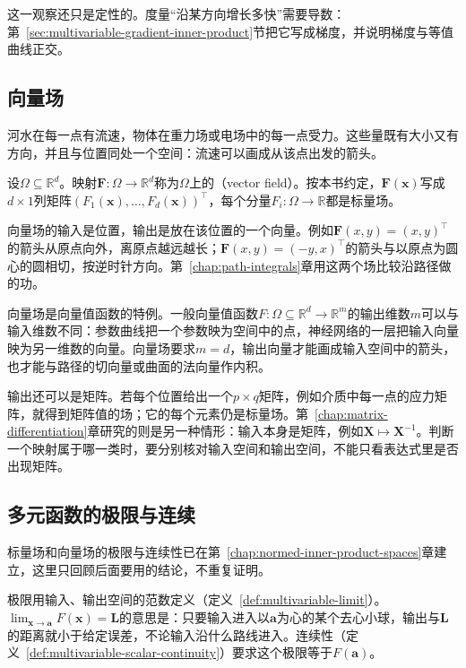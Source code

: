 这一观察还只是定性的。度量“沿某方向增长多快”需要导数：第~\ref{sec:multivariable-gradient-inner-product}节把它写成梯度，并说明梯度与等值曲线正交。

\subsection{向量场}
\label{sec:multivariable-vector-fields}

河水在每一点有流速，物体在重力场或电场中的每一点受力。这些量既有大小又有方向，并且与位置同处一个空间：流速可以画成从该点出发的箭头。
\begin{definition}[向量场]
\label{def:multivariable-vector-field}
设$\Omega\subseteq\mathbb R^d$。映射$\bm F:\Omega\to\mathbb R^d$称为$\Omega$上的（vector field）。按本书约定，$\bm F(\bm x)$写成$d\times1$列矩阵$(F_1(\bm x),\ldots,F_d(\bm x))^\top$，每个分量$F_i:\Omega\to\mathbb R$都是标量场。
\end{definition}
向量场的输入是位置，输出是放在该位置的一个向量。例如$\bm F(x,y)=(x,y)^\top$的箭头从原点向外，离原点越远越长；$\bm F(x,y)=(-y,x)^\top$的箭头与以原点为圆心的圆相切，按逆时针方向。第~\ref{chap:path-integrals}章用这两个场比较沿路径做的功。

向量场是向量值函数的特例。一般向量值函数$F:\Omega\subseteq\mathbb R^d\to\mathbb R^m$的输出维数$m$可以与输入维数不同：参数曲线把一个参数映为空间中的点，神经网络的一层把输入向量映为另一维数的向量。向量场要求$m=d$，输出向量才能画成输入空间中的箭头，也才能与路径的切向量或曲面的法向量作内积。

输出还可以是矩阵。若每个位置给出一个$p\times q$矩阵，例如介质中每一点的应力矩阵，就得到矩阵值的场；它的每个元素仍是标量场。第~\ref{chap:matrix-differentiation}章研究的则是另一种情形：输入本身是矩阵，例如$\bm X\mapsto\bm X^{-1}$。判断一个映射属于哪一类时，要分别核对输入空间和输出空间，不能只看表达式里是否出现矩阵。

\subsection{多元函数的极限与连续}
\label{sec:multivariable-field-limits-continuity}

标量场和向量场的极限与连续性已在第~\ref{chap:normed-inner-product-spaces}章建立，这里只回顾后面要用的结论，不重复证明。

极限用输入、输出空间的范数定义（定义~\ref{def:multivariable-limit}）。$\lim_{\bm x\to\bm a}F(\bm x)=\bm L$的意思是：只要输入进入以$\bm a$为心的某个去心小球，输出与$\bm L$的距离就小于给定误差，不论输入沿什么路线进入。连续性（定义~\ref{def:multivariable-scalar-continuity}）要求这个极限等于$F(\bm a)$。

